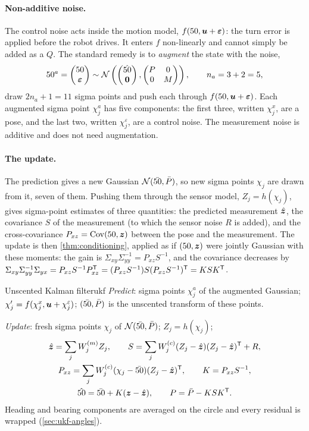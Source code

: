 \paragraph{Non-additive noise.} The control noise acts inside the motion
model, $f(50,\bm{u}+\bm{\varepsilon})$: the turn error is applied before the robot
drives. It enters $f$ non-linearly and cannot simply be added as a $Q$.
The standard remedy is to \emph{augment} the state with the noise,
\[
  50^a=\begin{pmatrix}50\\\bm{\varepsilon}\end{pmatrix}\sim
  \mathcal{N}\left(\begin{pmatrix}\hat{50}\\\bm{0}\end{pmatrix},
  \begin{pmatrix}P&0\\0&M\end{pmatrix}\right),\qquad n_a=3+2=5,
\]
draw $2n_a+1=11$ sigma points and push each through
$f(50,\bm{u}+\bm{\varepsilon})$. Each augmented sigma point $\chi^a_j$ has five
components: the first three, written $\chi^x_j$, are a pose, and the last
two, written $\chi^\varepsilon_j$, are a control noise. The measurement
noise is additive and does not need augmentation.

\paragraph{The update.} The prediction gives a new Gaussian
$\mathcal{N}(\bar{50},\bar P)$, so new sigma points $\chi_j$ are drawn from it,
seven of them. Pushing them through the sensor model, $Z_j=h(\chi_j)$,
gives sigma-point estimates of three quantities: the predicted measurement
$\hat{\bm{z}}$, the covariance $S$ of the measurement (to which the sensor noise
$R$ is added), and the cross-covariance $P_{xz}=\operatorname{Cov}(50,\bm{z})$ between the
pose and the measurement. The update is then \cref{thm:conditioning},
applied as if $(50,\bm{z})$ were jointly Gaussian with these moments: the gain
is $\Sigma_{xy}\Sigma_{yy}^{-1}=P_{xz}S^{-1}$, and the covariance decreases
by $\Sigma_{xy}\Sigma_{yy}^{-1}\Sigma_{yx}=P_{xz}S^{-1}P_{xz}^{\mathsf{T}}
=(P_{xz}S^{-1})S(P_{xz}S^{-1})^{\mathsf{T}}=KSK^{\mathsf{T}}$.

\begin{definition}{Unscented Kalman filter}{ukf}
\emph{Predict}: sigma points $\chi^a_j$ of the augmented Gaussian;
$\chi'_j=f(\chi^x_j,\bm{u}+\chi^\varepsilon_j)$; $(\bar{50},\bar P)$ is the
unscented transform of these points.

\emph{Update}: fresh sigma points $\chi_j$ of $\mathcal{N}(\bar{50},\bar P)$;
$Z_j=h(\chi_j)$;
\begin{gather*}
  \hat{\bm{z}}=\sum_jW^{(m)}_jZ_j,\qquad
  S=\sum_jW^{(c)}_j(Z_j-\hat{\bm{z}})(Z_j-\hat{\bm{z}})^{\mathsf{T}}+R,\\
  P_{xz}=\sum_jW^{(c)}_j(\chi_j-\bar{50})(Z_j-\hat{\bm{z}})^{\mathsf{T}},\qquad
  K=P_{xz}S^{-1},\\
  \hat{50}=\bar{50}+K(\bm{z}-\hat{\bm{z}}),\qquad P=\bar P-KSK^{\mathsf{T}} .
\end{gather*}
Heading and bearing components are averaged on the circle and every
residual is wrapped (\cref{sec:ukf-angles}).
\end{definition}

